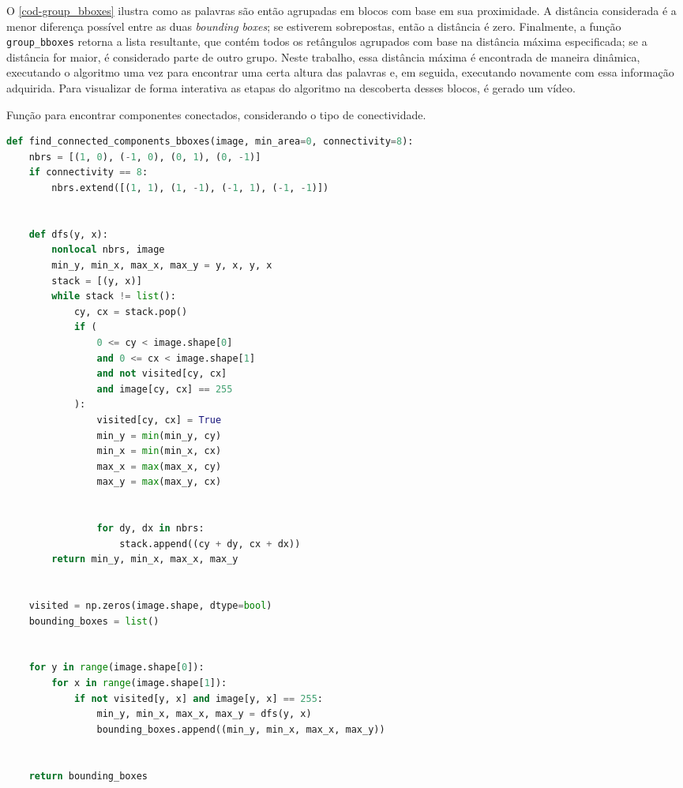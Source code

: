 \documentclass[english, 
               brazil, 
               bsc] %
               {dcomp-abntex2}
\begin{document}
O \autoref{cod-group_bboxes} ilustra como as palavras são então agrupadas em blocos com base em sua proximidade. A distância considerada é a menor diferença possível entre as duas \textit{bounding boxes}; se estiverem sobrepostas, então a distância é zero. Finalmente, a função \texttt{group\_bboxes} retorna a lista resultante, que contém todos os retângulos agrupados com base na distância máxima especificada; se a distância for maior, é considerado parte de outro grupo. Neste trabalho, essa distância máxima é encontrada de maneira dinâmica, executando o algoritmo uma vez para encontrar uma certa altura das palavras e, em seguida, executando novamente com essa informação adquirida. Para visualizar de forma interativa as etapas do algoritmo na descoberta desses blocos, é gerado um vídeo.




\begin{codigo}[h]
  \caption{\small Função para encontrar componentes conectados, considerando o tipo de conectividade.}
 \label{cod-findcomp}
\begin{lstlisting}[language=python]
def find_connected_components_bboxes(image, min_area=0, connectivity=8):
    nbrs = [(1, 0), (-1, 0), (0, 1), (0, -1)]
    if connectivity == 8:
        nbrs.extend([(1, 1), (1, -1), (-1, 1), (-1, -1)])


    def dfs(y, x):
        nonlocal nbrs, image
        min_y, min_x, max_x, max_y = y, x, y, x
        stack = [(y, x)]
        while stack != list():
            cy, cx = stack.pop()
            if (
                0 <= cy < image.shape[0]
                and 0 <= cx < image.shape[1]
                and not visited[cy, cx]
                and image[cy, cx] == 255
            ):
                visited[cy, cx] = True
                min_y = min(min_y, cy)
                min_x = min(min_x, cx)
                max_x = max(max_x, cy)
                max_y = max(max_y, cx)


                for dy, dx in nbrs:
                    stack.append((cy + dy, cx + dx))
        return min_y, min_x, max_x, max_y


    visited = np.zeros(image.shape, dtype=bool)
    bounding_boxes = list()


    for y in range(image.shape[0]):
        for x in range(image.shape[1]):
            if not visited[y, x] and image[y, x] == 255:
                min_y, min_x, max_x, max_y = dfs(y, x)
                bounding_boxes.append((min_y, min_x, max_x, max_y))


    return bounding_boxes


\end{lstlisting}
\end{codigo}
\end{document}
